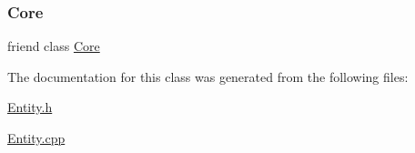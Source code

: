 \subsubsection{\texorpdfstring{Core}{Core}}
{\footnotesize\ttfamily friend class \mbox{\hyperlink{class_core}{Core}}\hspace{0.3cm}{\ttfamily [friend]}}



The documentation for this class was generated from the following files\+:\begin{DoxyCompactItemize}
\item 
\mbox{\hyperlink{_entity_8h}{Entity.\+h}}\item 
\mbox{\hyperlink{_entity_8cpp}{Entity.\+cpp}}\end{DoxyCompactItemize}

